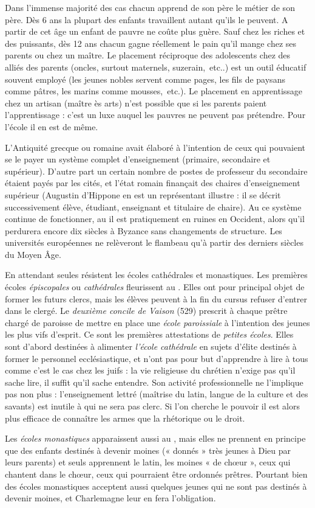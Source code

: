  Dans l'immense majorité des cas chacun apprend de son père le métier de son père. Dès 6 ans la plupart des enfants travaillent autant qu'ils le peuvent. A partir de cet âge un enfant de pauvre ne coûte plus guère. Sauf chez les riches et des puissants, dès 12 ans chacun gagne réellement le pain qu'il mange chez ses parents ou chez un maître. Le placement réciproque des adolescents chez des alliés des parents (oncles, surtout maternels, suzerain,~etc..) est un outil éducatif souvent employé (les jeunes nobles servent comme pages, les fils de paysans comme pâtres, les marins comme mousses,~etc.). Le placement en apprentissage chez un artisan (maître ès arts) n'est possible que si les parents paient l'apprentissage : c'est un luxe auquel les pauvres ne peuvent pas prétendre. Pour l'école il en est de même. 

 L'Antiquité grecque ou romaine avait élaboré à l'intention de ceux qui pouvaient se le payer un système complet d'enseignement (primaire, secondaire et supérieur). D'autre part un certain nombre de postes de professeur du secondaire étaient payés par les cités, et l'état romain finançait des chaires d'enseignement supérieur (Augustin d'Hippone en est un représentant illustre : il se décrit successivement élève, étudiant, enseignant et titulaire de chaire). Au  ce système continue de fonctionner, au  il est pratiquement en ruines en Occident, alors qu'il perdurera encore dix siècles à Byzance sans changements de structure. Les universités européennes ne relèveront le flambeau qu'à partir des derniers siècles du Moyen Âge. 

 En attendant seules résistent les écoles cathédrales et monastiques. Les premières écoles \emph{épiscopales} ou \emph{cathédrales} fleurissent au . Elles ont pour principal objet de former les futurs clercs, mais les élèves peuvent à la fin du cursus refuser d'entrer dans le clergé. Le \emph{deuxième concile de Vaison} (529) prescrit à chaque prêtre chargé de paroisse de mettre en place une \emph{école paroissiale} à l'intention des jeunes les plus vifs d'esprit. Ce sont les premières attestations de \emph{petites écoles}. Elles sont d'abord destinées à alimenter \emph{l'école cathédrale} en sujets d'élite destinés à former le personnel ecclésiastique, et n'ont pas pour but d'apprendre à lire à tous comme c'est le cas chez les juifs : la vie religieuse du chrétien n'exige pas qu'il sache lire, il suffit qu'il sache entendre. Son activité professionnelle ne l'implique pas non plus : l'enseignement lettré (maîtrise du latin, langue de la culture et des savants) est inutile à qui ne sera pas clerc. Si l'on cherche le pouvoir il est alors plus efficace de connaître les armes que la rhétorique ou le droit. 
 
 Les \emph{écoles monastiques} apparaissent aussi au , mais elles ne prennent en principe que des enfants destinés à devenir moines (« donnés » très jeunes à Dieu par leurs parents) et seuls apprennent le latin, les moines « de chœur », ceux qui chantent dans le chœur, ceux qui pourraient être ordonnés prêtres. Pourtant bien des écoles monastiques acceptent aussi quelques jeunes qui ne sont pas destinés à devenir moines, et Charlemagne leur en fera l'obligation.
 
 
 
